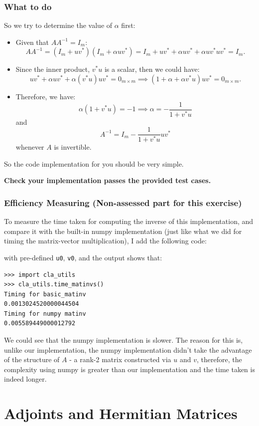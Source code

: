 \subsubsection*{What to do}
\noindent So we try to determine the value of $\alpha$ first:
\begin{itemize}
  \item Given that $A A^{-1} = I_m$:
    \[
      A A^{-1} = (I_m + u v^{*})(I_m + \alpha u v^{*}) = I_m + uv^{*} + \alpha uv^{*} + \alpha u v^{*}uv^{*} = I_m
    .\]
  \item Since the inner product, $v^{*}u$ is a scalar, then we could have:
    \[
      uv^{*} + \alpha uv^{*} + \alpha (v^{*}u)uv^{*} = 0_{m \times m} \implies (1 + \alpha + \alpha v^{*}u)uv^{*} = 0_{m \times m}
    .\]
  \item Therefore, we have:
    \[
    \alpha (1 + v^{*}u) = -1 \implies \alpha = -\frac{1}{1 + v^{*}u}
    \]
    and
    \[
    A^{-1} = I_m -\frac{1}{1 + v^{*}u} uv^{*}
    \]
    whenever $A$ is invertible.
\end{itemize}
So the code implementation for you should be very simple. \checked \medskip

\noindent \textbf{Check your implementation passes the provided test cases.}
\subsubsection*{Efficiency Measuring (Non-assessed part for this exercise)}
To measure the time taken for computing the inverse of this implementation, and compare it with the built-in numpy implementation (just like what we did for timing the matrix-vector multiplication), I add the following code:

with pre-defined \texttt{u0}, \texttt{v0}, and the output shows that:
\begin{lstlisting}
>>> import cla_utils
>>> cla_utils.time_matinvs()
Timing for basic_matinv
0.0013024520000044504
Timing for numpy matinv
0.005589449000012792
\end{lstlisting}

\noindent We could see that the numpy implementation is slower. The reason for this is, unlike our implementation, the numpy implementation didn't take the advantage of the structure of \(A\) - a rank-2 matrix constructed via \(u\) and \(v\), therefore, the complexity using numpy is greater than our implementation and the time taken is indeed longer.

\section{Adjoints and Hermitian Matrices}%
\label{sec1.7}
